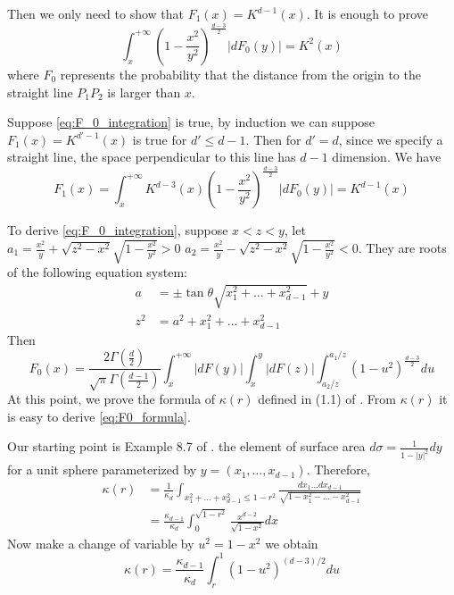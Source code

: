\documentclass{article}
\begin{document}
Then we only need to show that $F_1(x)=K^{d-1}(x)$.
It is enough to prove
\begin{equation}\label{eq:F_0_integration}
    \int_x^{+\infty}
    (1-\frac{x^2}{y^2})^{\frac{d-3}{2}} |dF_0(y)| = K^2(x)
\end{equation}
where $F_0$ represents the
probability that the distance from the origin to the straight line
$P_1P_2$ is larger than $x$.

Suppose \eqref{eq:F_0_integration} is true, 
by induction we can suppose $F_1(x)=K^{d'-1}(x)$ is true for
$d'\leq d-1$. Then for $d'=d$, 
since we specify a straight line, the space perpendicular 
to this line has $d-1$ dimension. We have
\begin{equation}
    F_1(x) = \int_x^{+\infty} K^{d-3}(x) (1-\frac{x^2}{y^2})^{\frac{d-3}{2}}|dF_0(y)|
    = K^{d-1}(x)
\end{equation}

To derive \eqref{eq:F_0_integration},
suppose $x<z<y$,
let $a_1=\frac{x^2}{y}+\sqrt{z^2-x^2}\sqrt{1-\frac{x^2}{y^2}} > 0$
$a_2=\frac{x^2}{y}-\sqrt{z^2-x^2}\sqrt{1-\frac{x^2}{y^2}} < 0$.
They are roots of the following equation system:
\begin{align*}
a & = \pm \tan \theta \sqrt{x_1^2+\dots + x_{d-1}^2} + y \\    
z^2 &= a^2 + x_1^2 + \dots + x_{d-1}^2
\end{align*}
Then
\begin{equation}\label{eq:F0_formula}
    F_0(x)=\frac{2\Gamma(\frac{d}{2})}
    {\sqrt{\pi}\Gamma(\frac{d-1}{2})}
    \int_x^{+\infty} |dF(y)|
    \int_x^{y} |dF(z)|\int_{a_2/z}^{a_1 /z} (1-u^2)^{\frac{d-3}{2}}du
\end{equation}
At this point, we prove the formula of
$\kappa(r)$ defined in (1.1) of \cite{dwyer1991convex}.
From $\kappa(r)$ it is easy to derive \eqref{eq:F0_formula}.

Our starting point is Example 8.7 of \cite{surfaceArea}.
the element of surface area $d\sigma = \frac{1}{1-|y|^2}dy$
for a unit sphere parameterized by $y=(x_1, \dots, x_{d-1})$.
Therefore,
\begin{align*}
    \kappa(r) &= \frac{1}{\kappa_d}\int_{x_1^2 + \dots + x_{d-1}^2 \leq 1-r^2}
    \frac{dx_1 \dots dx_{d-1}}{\sqrt{1-x_1^2-\dots -x_{d-1}^2}}\\
    &=\frac{\kappa_{d-1}}{\kappa_d}\int_0^{\sqrt{1-r^2}} \frac{x^{d-2}}{\sqrt{1-x^2}}dx
\end{align*}
Now make a change of variable by $u^2=1-x^2$ we obtain
\begin{equation}
    \kappa(r)=\frac{\kappa_{d-1}}{\kappa_d}\int_r^1 (1-u^2)^{(d-3)/2}du
\end{equation}
\end{document}
